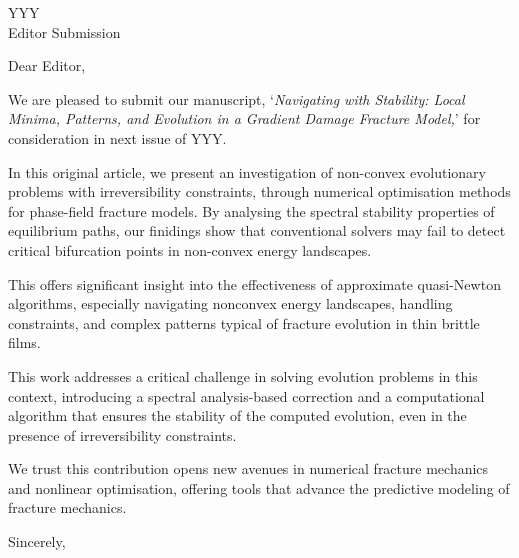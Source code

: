 \documentclass[nofoundrysterling]{cnrsletter} %
\begin{document}
\begin{letter}{
    YYY\\
    Editor Submission\\
}

\subject{We Submit an Original Article}  

\opening{Dear Editor,}

We are pleased to submit our manuscript, `\emph{Navigating with Stability: Local Minima, Patterns, and
Evolution in a Gradient Damage Fracture Model,}' for consideration in next issue of YYY. 

In this original article, we present an investigation of non-convex evolutionary problems with irreversibility constraints, through numerical optimisation methods for phase-field fracture models. By analysing the spectral stability properties of equilibrium paths, our finidings show that conventional solvers may fail to detect critical bifurcation points in non-convex energy landscapes. 

This offers significant insight into the effectiveness of approximate quasi-Newton algorithms, especially navigating nonconvex energy landscapes, handling constraints, and complex patterns typical of fracture evolution in thin brittle films. 

This work addresses a critical challenge in solving evolution problems in this context,  introducing a spectral analysis-based correction and a computational algorithm that ensures the stability of the computed evolution, even in the presence of irreversibility constraints. 

We trust this contribution opens new avenues in numerical fracture mechanics and nonlinear optimisation, offering tools that advance the predictive modeling of fracture mechanics.


\closing{Sincerely,} %
\end{letter}
\end{document}
